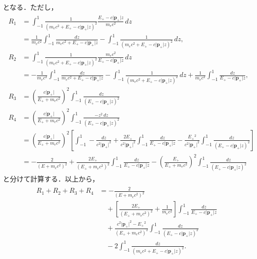 となる．ただし，
\begin{align}
  \begin{split}
    R_1 &= \int_{-1}^1 \frac{1}{(m_ec^2 + E_+ - c\lvert\boldsymbol{p}_+\rvert z)^2}\frac{E_+ - c\lvert\boldsymbol{p}_+\rvert z}{m_ec^2}\,dz \\
    &= \frac{1}{m_ec^2}\int_{-1}^1 \frac{dz}{m_ec^2 + E_+ - c\lvert\boldsymbol{p}_+\rvert z} - \int_{-1}^1 \frac{1}{(m_ec^2 + E_+ - c\lvert\boldsymbol{p}_+\rvert z)^2}\,dz,\\
    R_2 &= \int_{-1}^1 \frac{1}{(m_ec^2 + E_+ - c\lvert\boldsymbol{p}_+\rvert z)^2}\frac{m_ec^2}{E_+ - c\lvert\boldsymbol{p}_+\rvert z}\,dz \\
    &= -\frac{1}{m_ec^2}\int_{-1}^1 \frac{dz}{m_ec^2 + E_+ - c\lvert\boldsymbol{p}_+\rvert z} - \int_{-1}^1 \frac{1}{(m_ec^2 + E_+ - c\lvert\boldsymbol{p}_+\rvert z)^2}\,dz + \frac{1}{m_ec^2}\int^1_{-1}\frac{dz}{E_+ - c\lvert\boldsymbol{p}_+\rvert z}, \\
    R_3 &= \left(\frac{c\lvert\boldsymbol{p}_+\rvert}{E_+ + m_ec^2}\right)^2 \int_{-1}^1 \frac{dz}{(E_+ - c\lvert\boldsymbol{p}_+\rvert z)^2} \\
    R_4 &= \left(\frac{c\lvert\boldsymbol{p}_+\rvert}{E_+ + m_ec^2}\right)^2 \int_{-1}^1 \frac{-z^2\,dz}{(E_+ - c\lvert\boldsymbol{p}_+\rvert z)^2} \\
    &= \left(\frac{c\lvert\boldsymbol{p}_+\rvert}{E_+ + m_ec^2}\right)^2 \left[\int_{-1}^1 -\frac{dz}{c^2\lvert\boldsymbol{p}_+\rvert^2} + \frac{2E_+}{c^2\lvert\boldsymbol{p}_+\rvert^2}\int_{-1}^1 \frac{dz}{E_+ - c\lvert\boldsymbol{p}_+\rvert z} - \frac{E_+{}^2}{c^2\lvert\boldsymbol{p}_+\rvert^2}\int_{-1}^1 \frac{dz}{(E_+ - c\lvert\boldsymbol{p}_+\rvert z)^2}\right] \\
    &= -\frac{2}{(E+m_ec^2)^2} + \frac{2E_+}{(E_+ + m_ec^2)^2} \int_{-1}^1 \frac{dz}{E_+ - c\lvert\boldsymbol{p}_+\rvert z} - \left(\frac{E_+}{E_+ + m_ec^2}\right)^2 \int_{-1}^1 \frac{dz}{(E_+ - c\lvert\boldsymbol{p}_+\rvert z)^2}
  \end{split}
\end{align}
と分けて計算する．以上から，
\begin{align}
  \begin{split}
    R_1 + R_2 + R_3 + R_4 &= -\frac{2}{(E+m_ec^2)^2}\\
    &\quad + \left[\frac{2E_+}{(E_+ + m_ec^2)^2} + \frac{1}{m_ec^2}\right]\int_{-1}^1 \frac{dz}{E_+ - c\lvert\boldsymbol{p}_+\rvert z} \\
    &\quad + \frac{c^2\lvert\boldsymbol{p}_+\rvert^2 - E_+{}^2}{(E_+ + m_ec^2)^2} \int_{-1}^1 \frac{dz}{(E_+ - c\lvert\boldsymbol{p}_+\rvert z)^2} \\
    &\quad - 2\int_{-1}^1 \frac{dz}{(m_ec^2 + E_+ - c\lvert\boldsymbol{p}_+\rvert z)^2}.
  \end{split}\label{Rsum}
\end{align}
